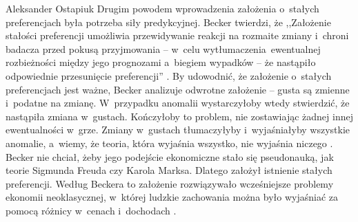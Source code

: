 \begin{artplenv}{Aleksander Ostapiuk}
Drugim powodem wprowadzenia założenia o~stałych preferencjach była potrzeba siły predykcyjnej. Becker twierdzi, że
,,Założenie stałości preferencji umożliwia przewidywanie reakcji na rozmaite zmiany i~chroni badacza przed pokusą
przyjmowania -- w~celu \guillemotleft wytłumaczenia\guillemotright\ 
ewentualnej rozbieżności między jego prognozami a~biegiem wypadków -- że
nastąpiło odpowiednie przesunięcie preferencji''
\parencite[s.~23]{becker_ekonomiczna_1990}.
By udowodnić, że
założenie o~stałych preferencjach jest ważne, Becker analizuje odwrotne założenie -- gusta są zmienne i~podatne na
zmianę. W~przypadku anomalii wystarczyłoby wtedy stwierdzić, że nastąpiła zmiana w~gustach. Kończyłoby to problem, nie
zostawiając żadnej innej ewentualności w~grze. Zmiany w~gustach tłumaczyłyby i~wyjaśniałyby wszystkie anomalie, a~wiemy,
że teoria, która wyjaśnia wszystko, nie wyjaśnia niczego
\parencite{popper_logic_1959}.
Becker nie chciał,
żeby jego podejście ekonomiczne stało się pseudonauką, jak teorie Sigmunda Freuda czy Karola Marksa. Dlatego założył istnienie stałych
preferencji. Według Beckera to założenie rozwiązywało wcześniejsze problemy ekonomii neoklasycznej, w~której ludzkie zachowania
można było wyjaśniać za pomocą różnicy w~cenach i~dochodach
\parencite{becker_gustibus_1977}.


\end{artplenv}

